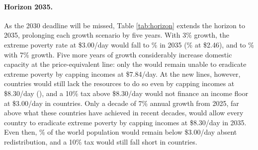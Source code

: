 \paragraph{Horizon 2035.} As the 2030 deadline will be missed, Table \ref{tab:horizon} extends the horizon to 2035, prolonging each growth scenario by five years. With 3\% growth, the extreme poverty rate at \$3.00/day would fall to \upRatePovThreeTF\% in 2035 (\upRatePovThreeTFEq\% at \$2.46), and to \upRatePovSevenTF\% with 7\% growth. Five more years of growth considerably increase domestic capacity at the price-equivalent line: only the \upCountriesCapTFEq{} would remain unable to eradicate extreme poverty by capping incomes at \$7.84/day. At the new lines, however, \upNbCapTF{} countries would still lack the resources to do so even by capping incomes at \$8.30/day (\upCountriesCapTF), and a 10\% tax above \$8.30/day would not finance an income floor at \$3.00/day in \upNbFloorTF{} countries. Only a decade of 7\% annual growth from 2025, far above what these countries have achieved in recent decades, would allow every country to eradicate extreme poverty by capping incomes at \$8.30/day in 2035. Even then, \upRatePovSevenTF\% of the world population would remain below \$3.00/day absent redistribution, and a 10\% tax would still fall short in \upNbFloorSevenTF{} countries.

